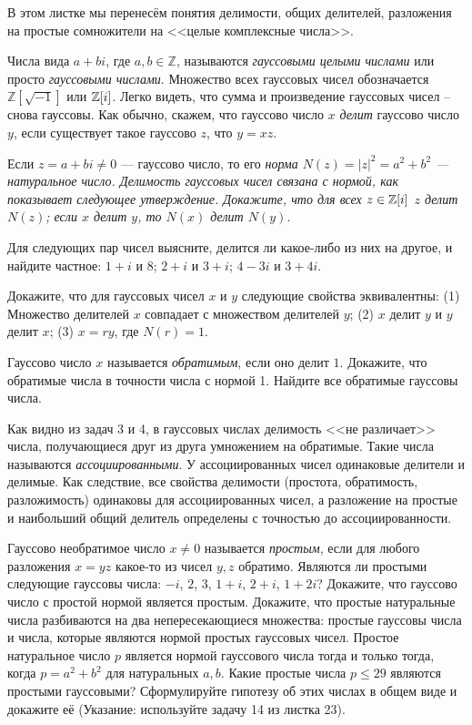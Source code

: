\documentclass[a4paper,12pt]{article}
\begin{document}
	
	{\footnotesize В этом листке мы перенесём понятия делимости, общих делителей, разложения на простые сомножители на <<целые комплексные числа>>.}
	
	 Числа вида $a+bi$, где $a,b \in \mathbb{Z}$, называются \emph{гауссовыми целыми числами} или просто \emph{гауссовыми числами}. Множество всех гауссовых чисел обозначается $\mathbb{Z}[\sqrt{-1}]$ или $\mathbb{Z}[i]$. Легко видеть, что сумма и произведение гауссовых чисел -- снова гауссовы. Как обычно, скажем, что гауссово число $x$ {\em делит} гауссово число $y$, если существует такое гауссово $z$, что $y=xz$.
	
	Если $z = a+bi \neq 0$ --- гауссово число, то его \it{норма} $N(z) = |z|^2 = a^2+b^2$ --- натуральное число. Делимость гауссовых чисел связана с нормой, как показывает следующее утверждение.
	  Докажите, что для всех $z \in \mathbb{Z}[i]$
	 $z$ делит $N(z)$;
	 если $x$ делит $y$, то $N(x)$ делит $N(y)$.
	
	 Для следующих пар чисел выясните, делится ли какое-либо из них на другое, и найдите частное:
	$1+i$ и $8$; $2+i$ и $3+i$; $4-3i$ и $3+4i$.
	
	 Докажите, что для гауссовых чисел $x$ и $y$ следующие свойства эквивалентны:
	(1) Множество делителей $x$ совпадает с множеством делителей $y$;	
	(2) $x$ делит $y$ и $y$ делит $x$; 
	(3) $x=ry$, где $N(r)=1$. 
	
	  Гауссово число $x$ называется {\em обратимым}, если оно делит $1$. Докажите, что обратимые числа в точности числа с нормой 1.
	 Найдите все обратимые гауссовы числа.
	
	{\footnotesize Как видно из задач 3 и 4, в гауссовых числах делимость <<не различает>> числа, получающиеся друг из друга умножением на обратимые. Такие числа называются {\it ассоциированными}. У ассоциированных чисел одинаковые делители и делимые. Как следствие, все свойства делимости (простота, обратимость, разложимость) одинаковы для ассоциированных чисел, а разложение на простые и наибольший общий делитель определены с точностью до ассоциированности.}
	
	 Гауссово необратимое число $x \neq 0$ называется {\em простым}, если для любого разложения $x=yz$ какое-то из чисел $y,z$ обратимо.
	  Являются ли простыми следующие гауссовы числа: $-i$, $2$, $3$, $1+i$, $2+i$, $1+2i$? 
	 Докажите, что гауссово число с простой нормой является простым. 
	 Докажите, что простые натуральные числа разбиваются на два непересекающиеся множества: простые гауссовы числа и числа, которые являются нормой простых гауссовых чисел.
	  Простое натуральное число $p$ является нормой гауссового числа тогда и только тогда, когда $p = a^2+b^2$ для натуральных $a,b$.  
	 Какие простые числа $p \leq 29$ являются простыми гауссовыми?
	   Сформулируйте гипотезу об этих числах в общем виде и докажите её (Указание: используйте задачу  14 из листка 23).
\end{document}
